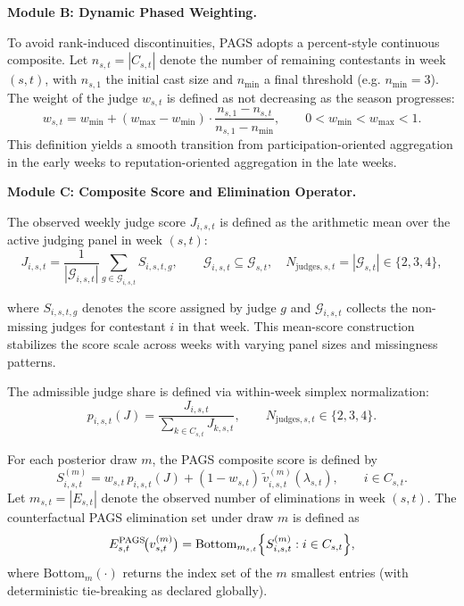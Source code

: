 \medskip
\noindent\textbf{Module B: Dynamic Phased Weighting.}\label{sec:q4_weight}

To avoid rank-induced discontinuities, PAGS adopts a percent-style continuous composite. Let $n_{s,t}=|C_{s,t}|$ denote the number of remaining contestants in week $(s,t)$, with $n_{s,1}$ the initial cast size and $n_{\min}$ a final threshold (e.g. $n_{\min}=3$). The weight of the judge $w_{s,t}$ is defined as not decreasing as the season progresses:
\begin{equation}
w_{s,t}
=
w_{\min}
+
(w_{\max}-w_{\min})
\cdot
\frac{n_{s,1}-n_{s,t}}{n_{s,1}-n_{\min}},
\qquad 0<w_{\min}<w_{\max}<1.
\label{eq:q4_weight_schedule}
\end{equation}
This definition yields a smooth transition from participation-oriented aggregation in the early weeks to reputation-oriented aggregation in the late weeks.

\medskip
\noindent\textbf{Module C: Composite Score and Elimination Operator.}\label{sec:q4_score}

The observed weekly judge score $J_{i,s,t}$ is defined as the arithmetic mean over the active judging panel in week $(s,t)$:
\begin{equation}
J_{i,s,t}
=
\frac{1}{|\mathcal{G}_{i,s,t}|}\sum_{g\in \mathcal{G}_{i,s,t}} S_{i,s,t,g},
\qquad 
\mathcal{G}_{i,s,t}\subseteq \mathcal{G}_{s,t},
\quad 
N_{\mathrm{judges},s,t}=|\mathcal{G}_{s,t}|\in\{2,3,4\},
\label{eq:q4_Javg}
\end{equation}

where $S_{i,s,t,g}$ denotes the score assigned by judge $g$ and $\mathcal{G}_{i,s,t}$ collects the non-missing judges for contestant $i$ in that week. This mean-score construction stabilizes the score scale across weeks with varying panel sizes and missingness patterns.

The admissible judge share is defined via within-week simplex normalization:
\begin{equation}
p_{i,s,t}(J)=\frac{J_{i,s,t}}{\sum_{k\in C_{s,t}} J_{k,s,t}},
\qquad 
N_{\mathrm{judges},s,t}\in\{2,3,4\}.
\label{eq:q4_jshare}
\end{equation}

For each posterior draw $m$, the PAGS composite score is defined by
\begin{equation}
S_{i,s,t}^{(m)}
=
w_{s,t}\,p_{i,s,t}(J)
+
(1-w_{s,t})\,\tilde v_{i,s,t}^{(m)}(\lambda_{s,t}),
\qquad i\in C_{s,t}.
\label{eq:q4_composite}
\end{equation}
Let $m_{s,t}=|E_{s,t}|$ denote the observed number of eliminations in week $(s,t)$. The counterfactual PAGS elimination set under draw $m$ is defined as
\begin{equation}
E_{s,t}^{\mathrm{PAGS}}\!\bigl(v^{(m)}_{s,t}\bigr)
=
\mathrm{Bottom}_{m_{s,t}}
\Bigl\{
S_{i,s,t}^{(m)}: i\in C_{s,t}
\Bigr\},
\label{eq:q4_elimset}
\end{equation}
where $\mathrm{Bottom}_{m}(\cdot)$ returns the index set of the $m$ smallest entries (with deterministic tie-breaking as declared globally).

